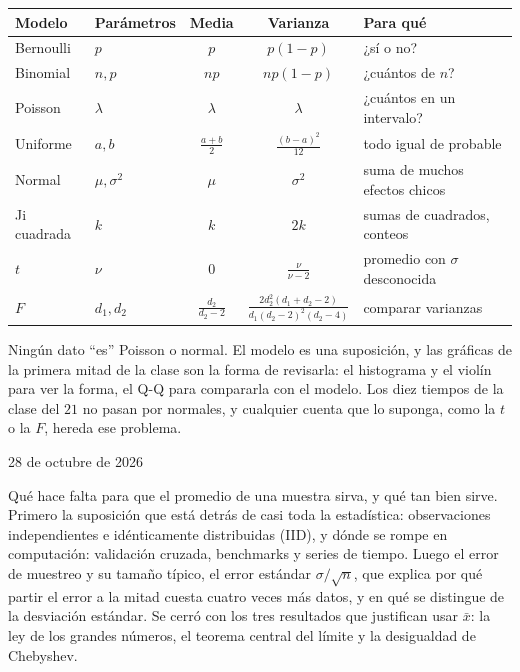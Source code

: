 \documentclass[11pt,letterpaper]{article}
\begin{document}
\begin{center}
\small
\renewcommand{\arraystretch}{1.25}
\begin{tabular}{llccl}
    \toprule
    \textbf{Modelo} & \textbf{Parámetros} & \textbf{Media}
    & \textbf{Varianza} & \textbf{Para qué} \\
    \midrule
    Bernoulli & $p$ & $p$ & $p(1-p)$ & ¿sí o no? \\
    Binomial & $n, p$ & $np$ & $np(1-p)$ & ¿cuántos de $n$? \\
    Poisson & $\lambda$ & $\lambda$ & $\lambda$
            & ¿cuántos en un intervalo? \\
    Uniforme & $a, b$ & $\frac{a+b}{2}$ & $\frac{(b-a)^2}{12}$
             & todo igual de probable \\
    Normal & $\mu, \sigma^2$ & $\mu$ & $\sigma^2$
           & suma de muchos efectos chicos \\
    Ji cuadrada & $k$ & $k$ & $2k$
                & sumas de cuadrados, conteos \\
    $t$ & $\nu$ & $0$ & $\frac{\nu}{\nu - 2}$
        & promedio con $\sigma$ desconocida \\
    $F$ & $d_1, d_2$ & $\frac{d_2}{d_2 - 2}$
        & $\frac{2 d_2^2 (d_1 + d_2 - 2)}{d_1 (d_2 - 2)^2 (d_2 - 4)}$
        & comparar varianzas \\
    \bottomrule
\end{tabular}
\end{center}

\begin{ojo}
    Ningún dato ``es'' Poisson o normal. El modelo es una suposición, y
    las gráficas de la primera mitad de la clase son la forma de
    revisarla: el histograma y el violín para ver la forma, el Q-Q
    para compararla con el modelo. Los diez tiempos de la clase del
    $21$ no pasan por normales, y cualquier cuenta que lo suponga, como
    la $t$ o la $F$, hereda ese problema.
\end{ojo}


\newpage

%
      {28 de octubre de 2026}

\begin{quick_sum}
    Qué hace falta para que el promedio de una muestra sirva, y qué tan
    bien sirve. Primero la suposición que está detrás de casi toda la
    estadística: observaciones independientes e idénticamente
    distribuidas (IID), y dónde se rompe en computación: validación
    cruzada, benchmarks y series de tiempo. Luego el error de muestreo
    y su tamaño típico, el error estándar $\sigma / \sqrt{n}$, que
    explica por qué partir el error a la mitad cuesta cuatro veces más
    datos, y en qué se distingue de la desviación estándar. Se cerró
    con los tres resultados que justifican usar $\bar{x}$: la ley de
    los grandes números, el teorema central del límite y la
    desigualdad de Chebyshev.
\end{quick_sum}
\end{document}
